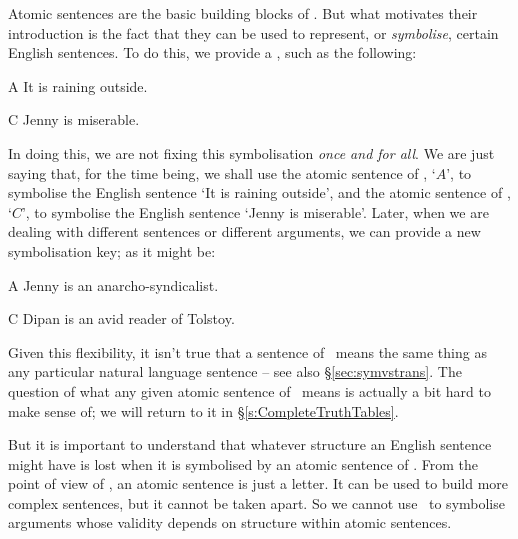 Atomic sentences are the basic building blocks of \TFL. But what motivates their introduction is the fact that they can be used to represent, or \emph{symbolise}, certain English sentences. To do this, we provide a , such as the following:
	\begin{ekey}
		\item[A] It is raining outside.
		\item[C] Jenny is miserable.
	\end{ekey}
In doing this, we are not fixing this symbolisation \emph{once and for all}. We are just saying that, for the time being, we shall use the atomic sentence of \TFL, `$A$', to symbolise the English sentence `It is raining outside', and the atomic sentence of \TFL, `$C$', to symbolise the English sentence `Jenny is miserable'. Later, when we are dealing with different sentences or different arguments, we can provide a new symbolisation key; as it might be:
	\begin{ekey}
		\item[A] Jenny is an anarcho-syndicalist.
		\item[C] Dipan is an avid reader of Tolstoy.
	\end{ekey}
Given this flexibility, it isn't true that a sentence of \TFL\ means the same thing as any particular natural language sentence – see also §\ref{sec:symvstrans}. The question of what any given atomic sentence of \TFL\ means is actually a bit hard to make sense of; we will return to it in §\ref{s:CompleteTruthTables}.


But it is important to understand that whatever structure an English sentence might have is lost when it is symbolised by an atomic sentence of \TFL. From the point of view of \TFL, an atomic sentence is just a letter. It can be used to build more complex sentences, but it cannot be taken apart. So we cannot use \TFL\ to symbolise arguments whose validity depends on structure within atomic sentences. 








